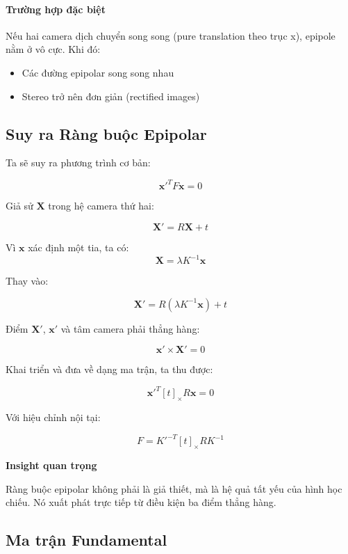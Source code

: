 \paragraph{Trường hợp đặc biệt}

Nếu hai camera dịch chuyển song song (pure translation theo trục x), epipole nằm ở vô cực. Khi đó:
\begin{itemize}
	\item Các đường epipolar song song nhau
	\item Stereo trở nên đơn giản (rectified images)
\end{itemize}

\subsection{Suy ra Ràng buộc Epipolar}
\label{subsec:derivation_constraint}

Ta sẽ suy ra phương trình cơ bản:

\[
\mathbf{x}'^T F \mathbf{x} = 0
\]

Giả sử $\mathbf{X}$ trong hệ camera thứ hai:

\[
\mathbf{X}' = R\mathbf{X} + t
\]

Vì $\mathbf{x}$ xác định một tia, ta có:
\[
\mathbf{X} = \lambda K^{-1}\mathbf{x}
\]

Thay vào:

\[
\mathbf{X}' = R(\lambda K^{-1}\mathbf{x}) + t
\]

Điểm $\mathbf{X}'$, $\mathbf{x}'$ và tâm camera phải thẳng hàng:

\[
\mathbf{x}' \times \mathbf{X}' = 0
\]

Khai triển và đưa về dạng ma trận, ta thu được:

\[
\mathbf{x}'^T [t]_\times R \mathbf{x} = 0
\]

Với hiệu chỉnh nội tại:

\[
F = K'^{-T} [t]_\times R K^{-1}
\]

\begin{mdframed}[style=infobox]
	\textbf{Insight quan trọng}
	
	Ràng buộc epipolar không phải là giả thiết, mà là hệ quả tất yếu của hình học chiếu. Nó xuất phát trực tiếp từ điều kiện ba điểm thẳng hàng.
\end{mdframed}

\subsection{Ma trận Fundamental}
\label{subsec:fundamental_matrix}

